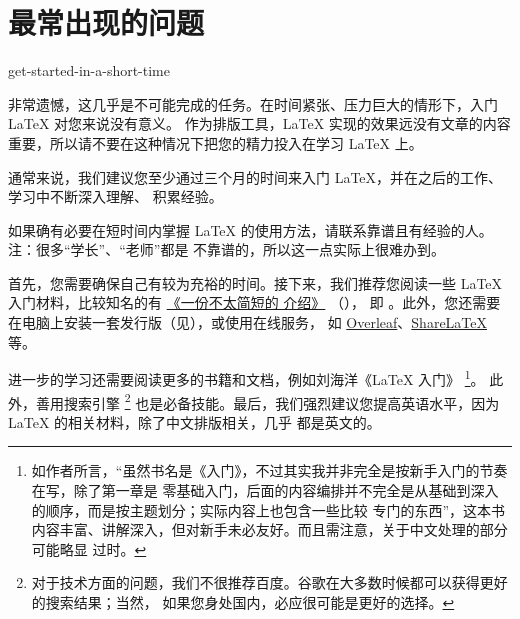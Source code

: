 %
%
%
%

\section{最常出现的问题}
\label{sec:starter}

%
  {get-started-in-a-short-time}

非常遗憾，这几乎是不可能完成的任务。在时间紧张、压力巨大的情形下，入门 \LaTeX{} 对您来说没有意义。
作为排版工具，\LaTeX{} 实现的效果远没有文章的内容重要，所以请不要在这种情况下把您的精力投入在学习
\LaTeX{} 上。

通常来说，我们建议您至少通过三个月的时间来入门 \LaTeX{}，并在之后的工作、学习中不断深入理解、
积累经验。

如果确有必要在短时间内掌握 \LaTeX{} 的使用方法，请联系靠谱且有经验的人。注：很多“学长”、“老师”都是
不靠谱的，所以这一点实际上很难办到。



首先，您需要确保自己有较为充裕的时间。接下来，我们推荐您阅读一些 \LaTeX{} 入门材料，比较知名的有
\href{http://mirrors.ctan.org/info/lshort/chinese/lshort-zh-cn.pdf}{《一份不太简短的 \LaTeXe{} 介绍》}
（\href{http://mirrors.ctan.org/info/lshort/english/lshort.pdf}{}），
即 。此外，您还需要在电脑上安装一套发行版（见），或使用在线服务，
如 \href{https://www.overleaf.com/}{Overleaf}、\href{https://www.sharelatex.com}{ShareLaTeX} 等。

进一步的学习还需要阅读更多的书籍和文档，例如刘海洋《\LaTeX{} 入门》
\footnote{如作者所言，“虽然书名是《入门》，不过其实我并非完全是按新手入门的节奏在写，除了第一章是
  零基础入门，后面的内容编排并不完全是从基础到深入的顺序，而是按主题划分；实际内容上也包含一些比较
  专门的东西”，这本书内容丰富、讲解深入，但对新手未必友好。而且需注意，关于中文处理的部分可能略显
  过时。}。
此外，善用搜索引擎
\footnote{对于技术方面的问题，我们不很推荐百度。谷歌在大多数时候都可以获得更好的搜索结果；当然，
  如果您身处国内，必应很可能是更好的选择。}
也是必备技能。最后，我们强烈建议您提高英语水平，因为 \LaTeX{} 的相关材料，除了中文排版相关，几乎
都是英文的。

